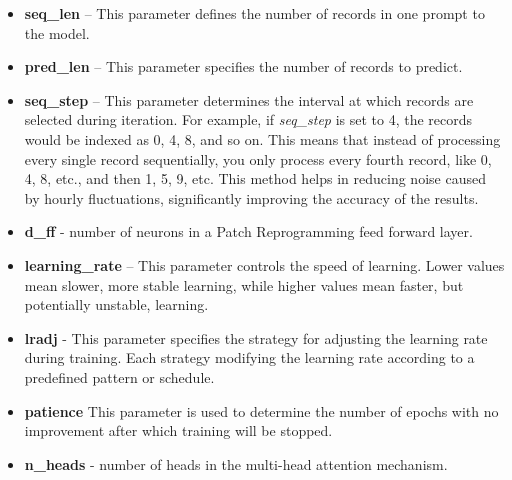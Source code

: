 \begin{itemize}
	\item \textbf{seq\_len} – This parameter defines the number of records in one prompt to the model.
	\item \textbf{pred\_len} – This parameter specifies the number of records to predict.
	\item \textbf{seq\_step} – This parameter determines the interval at which records are selected during iteration. For example, if \textit{seq\_step} is set to 4, the records would be indexed as 0, 4, 8, and so on. This means that instead of processing every single record sequentially, you only process every fourth record, like 0, 4, 8, etc., and then 1, 5, 9, etc. This method helps in reducing noise caused by hourly fluctuations, significantly improving the accuracy of the results.
	\item \textbf{d\_ff} - number of neurons in a Patch Reprogramming feed forward layer.
	\item \textbf{learning\_rate} – This parameter controls the speed of learning. Lower values mean slower, more stable learning, while higher values mean faster, but potentially unstable, learning.
	\item \textbf{lradj} - This parameter specifies the strategy for adjusting the learning rate during training. Each strategy modifying the learning rate according to a predefined pattern or schedule.
	\item \textbf{patience}   This parameter is used to determine the number of epochs with no improvement after which training will be stopped.
	\item \textbf{n\_heads} - number of heads in the multi-head attention mechanism.
\end{itemize}

